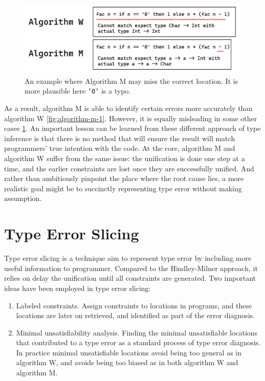 \begin{figure}[hbt]
  \includegraphics[width=0.8\linewidth]{AlgorithmWM2}
  \caption{
    \label{fig:algorithm-m-2}
    An example where Algorithm M may miss the correct location. It is more plausible here \texttt{'0'} is a typo.}
\end{figure}


As a result, algorithm M is able to identify certain errors more accurately than algorithm W \ref{fig:algorithm-m-1}. However, it is equally misleading in some other cases \ref{fig:algorithm-m-2}. An important lesson can be learned from these different approach of type inference is that there is no method that will ensure the result will match programmers' true intention with the code. At the core, algorithm M and algorithm W suffer from the same issue: the unification is done one step at a time, and the earlier constraints are lost once they are successfully unified. And rather than ambitiously pinpoint the place where the root cause lies, a more realistic goal might be to succinctly representing type error without making assumption.



\section{Type Error Slicing}

Type error slicing \cite{Tip2001-qn, Haack2004-fr} is a technique aim to represent type error by including more useful information to programmer. Compared to the Hindley-Milner approach, it relies on delay the unification until all constraints are generated. Two important ideas have been employed in type error slicing: 


\begin{enumerate}
  \item {
    Labeled constraints. Assign constraints to locations in programs, and these locations are later on retrieved, and identified as part of the error diagnosis. 
  }
  \item {
    Minimal unsatisfiability analysis. Finding the minimal unsatisfiable locations that contributed to a type error  as a standard process of type error diagnosis. In practice minimal unsatisfiable locations avoid being too general as in algorithm W, and avoids being too biased as in both algorithm W and algorithm M. 
  }
\end{enumerate}



